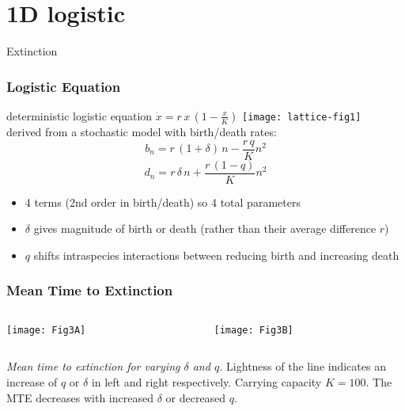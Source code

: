\documentclass{beamer}
\begin{document}
\section[Extinction]{1D logistic}

\begin{frame}
\centering
{{\Huge Extinction}}
\end{frame}


\begin{frame}
\frametitle{Logistic Equation}
deterministic logistic equation $\dot{x} = r \, x \, \left(1-\frac{x}{K}\right)$
\pause
\centering
\texttt{[image: lattice-fig1]} \\
\pause
derived from a stochastic model with birth/death rates:
\begin{equation*}
b_n = r\,(1 + \delta)\,n - \frac{r\,q}{K}n^2%
\label{birth}
\end{equation*}
\begin{equation*}
d_n = r\,\delta\,n + \frac{r\,(1-q)}{K} n^2%
\label{death}
\end{equation*}
\vspace{-0.2cm}
\pause
\begin{itemize}
\item 4 terms (2nd order in birth/death) so 4 total parameters
\item $\delta$ gives magnitude of birth or death (rather than their average difference $r$)
\item $q$ shifts intraspecies interactions between reducing birth and increasing death
\end{itemize}
\end{frame}


\begin{frame}
\frametitle{Mean Time to Extinction}
\begin{columns}
	\begin{column}{5.5cm}
		\begin{center}
			\texttt{[image: Fig3A]}
		\end{center}
	\end{column}
	\begin{column}{5.5cm}
		\begin{center}
			\texttt{[image: Fig3B]}
		\end{center}
	\end{column}
\end{columns}
\justifying
\emph{Mean time to extinction for varying $\delta$ and $q$.} 
Lightness of the line indicates an increase of $q$ or $\delta$ in left and right respectively. 
Carrying capacity $K=100$. 
The MTE decreases with increased $\delta$ or decreased $q$. 
\end{frame}
\end{document}
